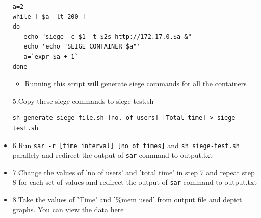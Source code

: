 \documentclass[11pt]{article}
\begin{document}
\begin{itemize}
\begin{verbatim}
a=2
while [ $a -lt 200 ]
do
   echo "siege -c $1 -t $2s http://172.17.0.$a &"
   echo 'echo "SEIGE CONTAINER $a"'
   a=`expr $a + 1`
done
\end{verbatim}
\begin{itemize}
\item Running this script will generate siege commands for all the containers
\end{itemize}
\item[{5.Copy these siege commands to siege-test.sh}] \begin{verbatim}
sh generate-siege-file.sh [no. of users] [Total time] > siege-test.sh
\end{verbatim}
\item 6.Run \texttt{sar -r [time interval] [no of times]} and \texttt{sh siege-test.sh}
  parallely and redirect the output of \texttt{sar} command to output.txt
\item 7.Change the values of 'no of users' and 'total time' in step 7 and repeat
step 8 for each set of values and redirect the output of \texttt{sar} command to
output.txt
\item 8.Take the values of 'Time' and '\%mem used' from output file and depict
graphs. You can view the data \href{./sar-test.org}{here}


\end{itemize}
\end{document}
